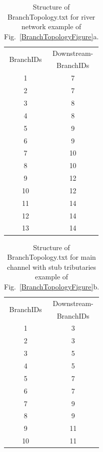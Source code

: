 \documentclass[11pt,a4paper]{article}
\begin{document}
\begin{multicols}{2}
\begin{table}[H]
\caption{Structure of BranchTopology.txt for river network example of Fig.~\ref{BranchTopologyFigure}a.}
\label{BranchTopologyRiverNetwork}
\vskip4mm
\centering
\begin{tabular}{c|c}
\hline\hline
\multirow{2}{*}{BranchIDs} & Downstream-\\
 & BranchIDs\\
\hline
1 & 7\\
\hline
2 & 7\\
\hline
3 & 8\\
\hline
4 & 8\\
\hline
5 & 9\\
\hline
6 & 9\\
\hline
7 & 10\\
\hline
8 & 10\\
\hline
9 & 12\\
\hline
10 & 12\\
\hline
11 & 14\\
\hline
12 & 14\\
\hline
13 & 14\\
\hline\hline
\end{tabular}
\end{table}

\thispagestyle{empty}
\enlargethispage{20\baselineskip}
\begin{table}[H]
\caption{Structure of BranchTopology.txt for main channel with stub tributaries example of Fig.~\ref{BranchTopologyFigure}b.}
\label{BranchTopologyMainChannelWithStubTributaries}
\vskip4mm
\centering
\begin{tabular}{c|c}
\hline\hline
\multirow{2}{*}{BranchIDs} & Downstream-\\
 & BranchIDs\\
\hline
1 & 3\\
\hline
2 & 3\\
\hline
3 & 5\\
\hline
4 & 5\\
\hline
5 & 7\\
\hline
6 & 7\\
\hline
7 & 9\\
\hline
8 & 9\\
\hline
9 & 11\\
\hline
10 & 11\\
\hline\hline
\end{tabular}
\end{table}
\end{multicols}
\pagebreak
\end{document}

